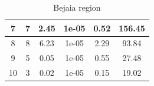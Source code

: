 \documentclass[10pt]{article}
\numberwithin{equation}{section}
\numberwithin{figure}{section}
\numberwithin{table}{section}
\begin{document}
\begin{table}[H]
\begin{tabular}{c|c|c|c|c|c|}
\multicolumn{1}{|c|}{7}             & 7               & 2.45                  & 1e-05                    & 0.52                   & 156.45                  \\ \hline
\multicolumn{1}{|c|}{8}             & 8               & 6.23                  & 1e-05                    & 2.29                   & 93.84                  \\ \hline
\multicolumn{1}{|c|}{9}             & 5               & 0.05                  & 1e-05                    & 0.55                   & 27.48                  \\ \hline
\multicolumn{1}{|c|}{10}             & 3               & 0.02                  & 1e-05                    & 0.15                   & 19.02                  \\ \hline
\end{tabular}
\caption{Bejaia region}
\label{BejaiaCross}
\end{table}
\end{document}
